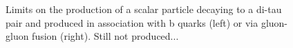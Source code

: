 \begin{figure}[tp]
  \centering
  \caption{ Limits on the production of a scalar particle decaying to a di-tau pair
    and produced     in association with b quarks (left) or   via gluon-gluon fusion (right). Still not produced...}
\label{fig:limit_xs}
\end{figure}


